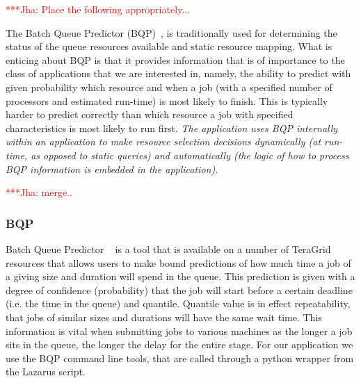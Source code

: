 \documentclass[conference,final]{IEEEtran}
\newcommand{\jhanote}[1]{ {\textcolor{red} { ***Jha: #1 }}}
\newcommand{\jhanote}[1]{}
\begin{document}

\jhanote{Place the following appropriately...}

 The Batch
Queue Predictor (BQP)~\cite{bqp, bqp_url}, is traditionally used for
determining the status of the queue resources available and static
resource mapping. What is enticing about BQP is that it provides
information that is of importance to the class of applications that we
are interested in, namely, the ability to predict with given
probability which resource and when a job (with a specified number of
processors and estimated run-time) is most likely to finish.  This is
typically harder to predict correctly than which resource a job with
specified characteristics is most likely to run first.  {\it The
  application uses BQP internally within an application to make
  resource selection decisions dynamically (at run-time, as opposed to
  static queries) and automatically (the logic of how to process BQP
  information is embedded in the application).}

\jhanote{merge..} 
\subsubsection{BQP}
Batch Queue Predictor ~\cite{bqp} is a tool that is available on a
number of TeraGrid resources that allows users to make bound
predictions of how much time a job of a giving size and duration will
spend in the queue.  This prediction is given with a degree of
confidence (probability) that the job will start before a certain
deadline (i.e. the time in the queue) and quantile. Quantile value is
in effect repeatability, that jobs of similar sizes and durations will
have the same wait time. This information is vital when
submitting jobs to various machines as the longer a job sits in the
queue, the longer the delay for the entire stage.  For our application
we use the BQP command line tools, that are called through a python wrapper
from the Lazarus script.
\end{document}
